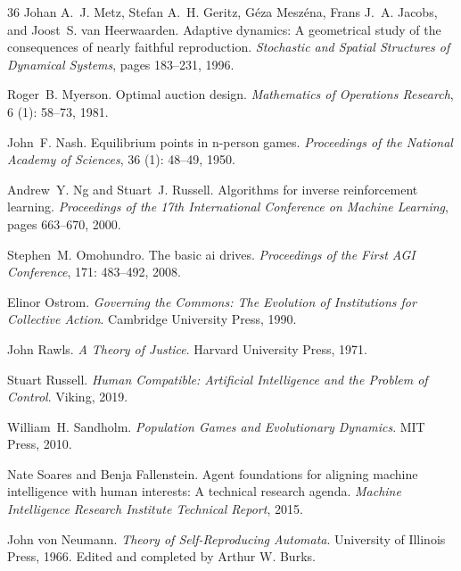 \documentclass[12pt]{article}
\begin{document}
\begin{thebibliography}{36}
Johan A.~J. Metz, Stefan A.~H. Geritz, G{\'e}za Mesz{\'e}na, Frans J.~A.
  Jacobs, and Joost~S. van Heerwaarden.
\newblock Adaptive dynamics: A geometrical study of the consequences of nearly
  faithful reproduction.
\newblock \emph{Stochastic and Spatial Structures of Dynamical Systems}, pages
  183--231, 1996.

Roger~B. Myerson.
\newblock Optimal auction design.
\newblock \emph{Mathematics of Operations Research}, 6 (1):
  58--73, 1981.

John~F. Nash.
\newblock Equilibrium points in n-person games.
\newblock \emph{Proceedings of the National Academy of Sciences}, 36
  (1): 48--49, 1950.

Andrew~Y. Ng and Stuart~J. Russell.
\newblock Algorithms for inverse reinforcement learning.
\newblock \emph{Proceedings of the 17th International Conference on Machine
  Learning}, pages 663--670, 2000.

Stephen~M. Omohundro.
\newblock The basic ai drives.
\newblock \emph{Proceedings of the First AGI Conference}, 171:
  483--492, 2008.

Elinor Ostrom.
\newblock \emph{Governing the Commons: The Evolution of Institutions for
  Collective Action}.
\newblock Cambridge University Press, 1990.

John Rawls.
\newblock \emph{A Theory of Justice}.
\newblock Harvard University Press, 1971.

Stuart Russell.
\newblock \emph{Human Compatible: Artificial Intelligence and the Problem of
  Control}.
\newblock Viking, 2019.

William~H. Sandholm.
\newblock \emph{Population Games and Evolutionary Dynamics}.
\newblock MIT Press, 2010.

Nate Soares and Benja Fallenstein.
\newblock Agent foundations for aligning machine intelligence with human
  interests: A technical research agenda.
\newblock \emph{Machine Intelligence Research Institute Technical Report},
  2015.

John von Neumann.
\newblock \emph{Theory of Self-Reproducing Automata}.
\newblock University of Illinois Press, 1966.
\newblock Edited and completed by Arthur W. Burks.


\end{thebibliography}
\end{document}
